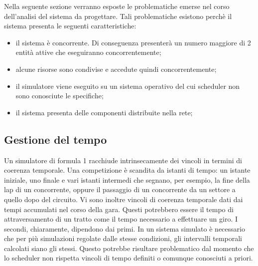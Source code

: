 Nella seguente sezione verranno esposte le problematiche emerse nel corso dell'analisi del sistema da progettare. Tali
problematiche esistono perchè il sistema presenta le seguenti caratteristiche:
\begin{itemize}
\item il sistema è concorrente. Di conseguenza presenterà un numero maggiore di 2 entità attive
che eseguiranno concorrentemente;
\item alcune risorse sono condivise e accedute quindi concorrentemente;
\item il simulatore viene eseguito su un sistema operativo del cui scheduler non sono conosciute le specifiche;
\item il sistema presenta delle componenti distribuite nella rete;
\end{itemize}
\subsection{Gestione del tempo}
Un simulatore di formula 1 racchiude intrinsecamente dei vincoli in termini di coerenza temporale. 
Una competizione è scandita da istanti di tempo: un istante iniziale, uno finale e vari istanti 
intermedi che segnano, per esempio, la fine della lap di un concorrente, oppure il passaggio di un concorrente da un settore
a quello dopo del circuito. Vi sono inoltre vincoli di coerenza temporale dati dai tempi accumulati nel corso
della gara. Questi potrebbero essere il tempo di attraversamento di un tratto come il tempo necessario
a effettuare un giro. I secondi, chiaramente, dipendono dai primi. 
In un sistema simulato è necessario che per più simulazioni regolate dalle stesse condizioni, 
gli intervalli temporali calcolati siano gli stessi. Questo potrebbe risultare problematico dal momento che
lo scheduler non rispetta vincoli di tempo definiti o comunque conosciuti a priori.
